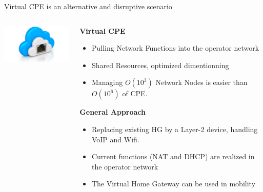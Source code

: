 \documentclass[a4paper]{beamer}
\begin{document}
\begin{frame}{Virtual CPE is an alternative and disruptive scenario}
						
	\begin{columns}[T]
		\begin{column}[T]{0.33 \textwidth} 
			\vspace{2.2cm}
			\includegraphics[width=12em]{vhg.png}
		\end{column}
										
		\begin{column}[T]{0.66\textwidth} 
										   
			\textbf{ Virtual CPE}
			\begin{itemize}
				\item Pulling Network Functions into the operator network
				\item Shared Resources, optimized dimentionning
				\item Managing $O(10^{3})$ Network Nodes is easier than $O(10^{6})$ of CPE.
			\end{itemize}
			\vspace{3mm}
			\textbf{General Approach}
			\begin{itemize}
				\item Replacing existing HG by a Layer-2 device, handling VoIP and Wifi.
				\item Current functions (NAT and DHCP) are realized in the operator network
				\item The Virtual Home Gateway can be used in mobility 
			\end{itemize}
										
																																						
		\end{column}
																										
	\end{columns}
										
\end{frame}
\end{document}
